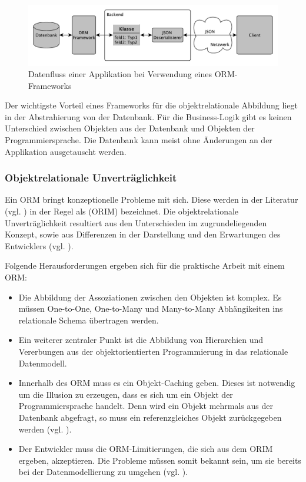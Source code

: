 \begin{figure}[h]   
  \centering     
  \includegraphics[width=1.0\textwidth]{img/dataflow_orm.pdf}  
   \caption{Datenfluss einer Applikation bei Verwendung eines ORM-Frameworks}   
  \label{fig:orm} 
\end{figure}

Der wichtigste Vorteil eines Frameworks für die objektrelationale Abbildung liegt in der Abstrahierung von der Datenbank. Für die Business-Logik gibt es keinen Unterschied zwischen Objekten aus der Datenbank und Objekten der Programmiersprache. Die Datenbank kann meist ohne Änderungen an der Applikation ausgetauscht werden.

\FloatBarrier
\subsubsection{Objektrelationale Unverträglichkeit}
\label{sec:unvertraeglich}
Ein ORM bringt konzeptionelle Probleme mit sich. Diese werden in der Literatur (vgl. \cite{ireland2009classification}) in der Regel als  (ORIM) bezeichnet. Die objektrelationale Unverträglichkeit resultiert aus den Unterschieden im zugrundeliegenden Konzept, sowie aus Differenzen in der Darstellung und den Erwartungen des Entwicklers (vgl. \cite{bowers}).

Folgende Herausforderungen ergeben sich für die praktische Arbeit mit einem ORM:

\begin{itemize}
  \item Die Abbildung der Assoziationen zwischen den Objekten ist komplex. Es müssen One-to-One, One-to-Many und Many-to-Many Abhängikeiten ins relationale Schema übertragen werden.
\item Ein weiterer zentraler Punkt ist die Abbildung von Hierarchien und Vererbungen aus der objektorientierten Programmierung in das relationale Datenmodell. 
\item Innerhalb des ORM muss es ein Objekt-Caching geben. Dieses ist notwendig um die Illusion zu erzeugen, dass es sich um ein Objekt der Programmiersprache handelt. Denn wird ein Objekt mehrmals aus der Datenbank abgefragt, so muss ein referenzgleiches Objekt zurückgegeben werden (vgl. \cite{inappropriate-abstractions}).
\item Der Entwickler muss die ORM-Limitierungen, die sich aus dem ORIM ergeben, akzeptieren. Die Probleme müssen somit bekannt sein, um sie bereits bei der Datenmodellierung zu umgehen (vgl. \cite{vietnam}). 
\end{itemize}

